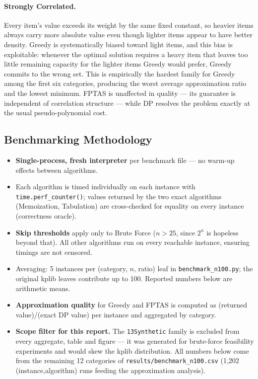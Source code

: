 \documentclass[11pt, a4paper]{article}
\begin{document}
\paragraph{Strongly Correlated.}
Every item's value exceeds its weight by the same fixed constant, so heavier
items always carry more absolute value even though lighter items appear to have
better density. Greedy is systematically biased toward light items, and this
bias is exploitable: whenever the optimal solution requires a heavy item that
leaves too little remaining capacity for the lighter items Greedy would prefer,
Greedy commits to the wrong set. This is empirically the hardest family for
Greedy among the first six categories, producing the worst average approximation
ratio and the lowest minimum. FPTAS is unaffected in quality --- its guarantee
is independent of correlation structure --- while DP resolves the problem
exactly at the usual pseudo-polynomial cost.

\subsection{Benchmarking Methodology}
\begin{itemize}[noitemsep,leftmargin=*]
\item \textbf{Single-process, fresh interpreter} per benchmark file --- no
      warm-up effects between algorithms.
\item Each algorithm is timed individually on each instance with
      \texttt{time.perf\_counter()}; values returned by the two exact algorithms
      (Memoization, Tabulation) are cross-checked for equality on every instance
      (correctness oracle).
\item \textbf{Skip thresholds} apply only to Brute Force ($n>25$, since $2^n$ is
      hopeless beyond that). All other algorithms run on every reachable
      instance, ensuring timings are not censored.
\item Averaging: 5 instances per (category, $n$, ratio) leaf in
      \texttt{benchmark\_n100.py}; the original kplib leaves contribute up to
      100. Reported numbers below are arithmetic means.
\item \textbf{Approximation quality} for Greedy and FPTAS is computed as
      (returned value)/(exact DP value) per instance and aggregated by category.
\item \textbf{Scope filter for this report.} The \texttt{13Synthetic} family is
      excluded from every aggregate, table and figure --- it was generated for
      brute-force feasibility experiments and would skew the kplib distribution.
      All numbers below come from the remaining 12 categories of
      \texttt{results/benchmark\_n100.csv} (1{,}202 (instance,algorithm)
      runs feeding the approximation analysis).
\end{itemize}
\end{document}
